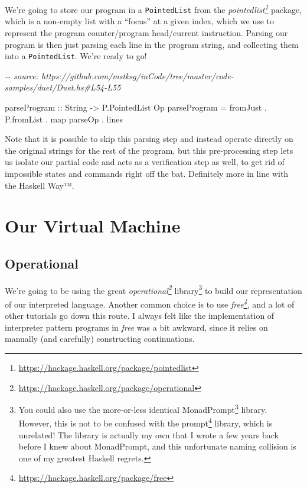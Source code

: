 \documentclass[]{article}
\newenvironment{Shaded}{}{}
\newcommand{\CommentTok}[1]{\textcolor[rgb]{0.38,0.63,0.69}{\textit{#1}}}
\newcommand{\DataTypeTok}[1]{\textcolor[rgb]{0.56,0.13,0.00}{#1}}
\newcommand{\FunctionTok}[1]{\textcolor[rgb]{0.02,0.16,0.49}{#1}}
\newcommand{\NormalTok}[1]{#1}
\newcommand{\OperatorTok}[1]{\textcolor[rgb]{0.40,0.40,0.40}{#1}}
\newcommand{\OtherTok}[1]{\textcolor[rgb]{0.00,0.44,0.13}{#1}}
\renewcommand{\href}[2]{#2\footnote{\url{#1}}}
\begin{document}
We're going to store our program in a \texttt{PointedList} from the
\emph{\href{https://hackage.haskell.org/package/pointedlist}{pointedlist}}
package, which is a non-empty list with a ``focus'' at a given index, which we
use to represent the program counter/program head/current instruction. Parsing
our program is then just parsing each line in the program string, and collecting
them into a \texttt{PointedList}. We're ready to go!

\begin{Shaded}
\begin{Highlighting}[]
\CommentTok{{-}{-} source: https://github.com/mstksg/inCode/tree/master/code{-}samples/duet/Duet.hs\#L54{-}L55}

\OtherTok{parseProgram ::} \DataTypeTok{String} \OtherTok{{-}\textgreater{}} \DataTypeTok{P.PointedList} \DataTypeTok{Op}
\NormalTok{parseProgram }\OtherTok{=}\NormalTok{ fromJust }\OperatorTok{.}\NormalTok{ P.fromList }\OperatorTok{.} \FunctionTok{map}\NormalTok{ parseOp }\OperatorTok{.} \FunctionTok{lines}
\end{Highlighting}
\end{Shaded}

Note that it is possible to skip this parsing step and instead operate directly
on the original strings for the rest of the program, but this pre-processing
step lets us isolate our partial code and acts as a verification step as well,
to get rid of impossible states and commands right off the bat. Definitely more
in line with the Haskell Way™.

\section{Our Virtual Machine}\label{our-virtual-machine}

\subsection{Operational}\label{operational}

We're going to be using the great
\emph{\href{https://hackage.haskell.org/package/operational}{operational}}
library\footnote{You could also use the more-or-less identical
  \href{https://hackage.haskell.org/package/operational}{MonadPrompt} library.
  However, this is not to be confused with the
  \href{https://hackage.haskell.org/package/prompt}{prompt} library, which is
  unrelated! The library is actually my own that I wrote a few years back before
  I knew about MonadPrompt, and this unfortunate naming collision is one of my
  greatest Haskell regrets.} to build our representation of our interpreted
language. Another common choice is to use
\emph{\href{https://hackage.haskell.org/package/free}{free}}, and a lot of other
tutorials go down this route. I always felt like the implementation of
interpreter pattern programs in \emph{free} was a bit awkward, since it relies
on manually (and carefully) constructing continuations.
\end{document}

